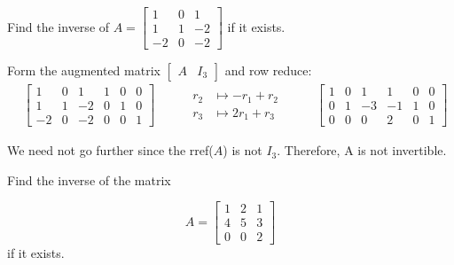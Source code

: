 \begin{example}
    Find the inverse of $A=\left[\begin{array}{rrr}1 & 0 & 1 \\ 1 & 1 & -2 \\ -2 & 0 & -2\end{array}\right]$ if it exists.
\end{example}

\begin{solution}
    Form the augmented matrix $\left[\begin{array}{ll}A & I_3\end{array}\right]$ and row reduce:
\[
\begin{alignedat}{3}
& \left[\begin{array}{cccccc}
1 & 0 & 1 & 1 & 0 & 0 \\
1 & 1 & -2 & 0 & 1 & 0 \\
-2 & 0 & -2 & 0 & 0 & 1
\end{array}\right]
& \quad & \begin{aligned}
    r_2 &\mapsto -r_1 + r_2 \\
    r_3 &\mapsto 2 r_1 + r_3
\end{aligned}
& \quad & \left[\begin{array}{cccccc}
1 & 0 & 1 & 1 & 0 & 0 \\
0 & 1 & -3 & -1 & 1 & 0 \\
0 & 0 & 0 & 2 & 0 & 1
\end{array}\right]
\end{alignedat}
\]

We need not go further since the rref($A$) is not $I_3$. Therefore, A is not invertible.
\end{solution}

\begin{example}
    Find the inverse of the matrix

    \[
    A=\left[\begin{array}{lll}
        1 & 2 & 1 \\
        4 & 5 & 3 \\
        0 & 0 & 2
        \end{array}\right]
    \]
if it exists.
\end{example}

